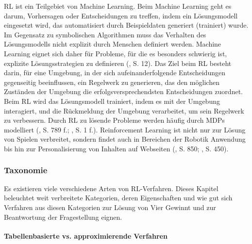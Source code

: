 RL ist ein Teilgebiet von Machine Learning. Beim Machine Learning geht es darum, Vorhersagen oder Entscheidungen zu treffen, indem ein Lösungsmodell eingesetzt wird, das automatisiert durch Beispieldaten generiert (trainiert) wurde. Im Gegensatz zu symbolischen Algorithmen muss das Verhalten des Lösungsmodells nicht explizit durch Menschen definiert werden. Machine Learning eignet sich daher für Probleme, für die es besonders schwierig ist, explizite Lösungsstrategien zu definieren (\cite{Humm.2020}, S. 12). Das Ziel beim RL besteht darin, für eine Umgebung, in der sich aufeinanderfolgende Entscheidungen gegenseitig beeinflussen, ein Regelwerk zu generieren, das den möglichen Zuständen der Umgebung die erfolgsversprechendsten Entscheidungen zuordnet. Beim RL wird das Lösungsmodell trainiert, indem es mit der Umgebung interagiert, und die Rückmeldung der Umgebung verarbeitet, um sein Regelwerk zu verbessern. Durch RL zu lösende Probleme werden häufig durch MDPs modelliert (\cite{Russell.2020}, S. 789 f.; \cite{Sutton.2018}, S. 1 f.). Reinforcement Learning ist nicht nur zur Lösung von Spielen verbreitet, sondern findet auch in Bereichen der Robotik Anwendung bis hin zur Personalisierung von Inhalten auf Webseiten (\cite{Russell.2020}, S. 850; \cite{Sutton.2018}, S. 450).

\subsubsection{Taxonomie}

Es existieren viele verschiedene Arten von RL-Verfahren. Dieses Kapitel beleuchtet weit verbreitete Kategorien, deren Eigenschaften und wie gut sich Verfahren aus diesen Kategorien zur Lösung von Vier Gewinnt und zur Beantwortung der Fragestellung eignen.

\paragraph{Tabellenbasierte vs. approximierende Verfahren}

\label{tabellenbasiert-vs-approximierende-verfahren}

